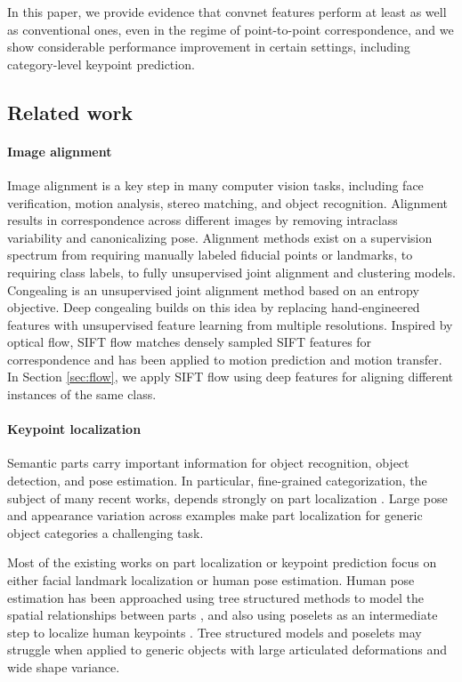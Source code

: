 \documentclass{article} \usepackage{nips14submit_e,times}
\begin{document}
In this paper, we provide evidence that convnet features perform at least as
well as conventional ones, even in the regime of point-to-point correspondence,
and we show considerable performance improvement in certain settings, including
category-level keypoint prediction.

\subsection{Related work}
\paragraph{Image alignment}

Image alignment is a key step in many computer vision tasks, including face
verification, motion analysis, stereo matching, and object recognition.
Alignment results in correspondence across different images by removing
intraclass variability and canonicalizing pose.
Alignment methods exist on a supervision spectrum from requiring
manually labeled fiducial points or landmarks, to requiring class labels, to
fully unsupervised joint alignment and clustering models.
Congealing \cite{congealing} is an unsupervised joint alignment method based on
an entropy objective.
Deep congealing \cite{deep_congealing} builds on this idea by
replacing hand-engineered features with unsupervised feature
learning from multiple resolutions.
Inspired by optical flow, SIFT flow \cite{sift-flow} matches densely sampled
SIFT features for correspondence and has been applied to motion prediction and
motion transfer.
In Section \ref{sec:flow}, we apply SIFT flow using deep features for aligning
different instances of the same class.

\paragraph{Keypoint localization}
Semantic parts carry important information for object recognition, object
detection, and pose estimation. In particular, fine-grained categorization,
the subject of many recent works, depends strongly on part localization
\cite{iccv13_keypoint, poof}.
Large pose and appearance variation across examples make
part localization for generic object categories a challenging task.

Most of the existing works on part localization or keypoint prediction focus on
either facial landmark localization \cite{Belhumeur_Localizing_2011} or human
pose estimation.
Human pose estimation has been approached
using tree structured methods
to model the spatial relationships between parts \cite{YangRamananCVPR11,
Min_Sun_ICCV11, Deva_2012}, and also using poselets
\cite{BourdevMalikICCV09} as an intermediate step to localize human keypoints
\cite{kposelet, armlet}.
Tree structured models and poselets may struggle when applied to generic objects
with large articulated deformations and wide shape variance.
\end{document}
